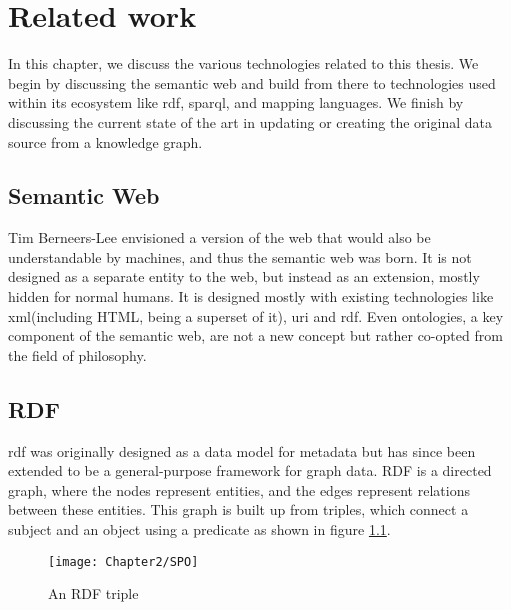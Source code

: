 
\chapter{Related work}
\label{chapter:related_work}

In this chapter, we discuss the various technologies related to this thesis. We begin by discussing the semantic web and build from there to technologies used within its ecosystem like \acrshort{rdf}, \acrshort{sparql}, and mapping languages. We finish by discussing the current state of the art in updating or creating the original data source from a knowledge graph.

\section{Semantic Web}
Tim Berneers-Lee envisioned a version of the web that would also be understandable by machines, and thus the semantic web was born. It is not designed as a separate entity to the web, but instead as an extension, mostly hidden for normal humans. It is designed mostly with existing technologies like \acrshort{xml}(including HTML, being a superset of it), \acrshort{uri} and \acrshort{rdf}. Even ontologies, a key component of the semantic web, are not a new concept but rather co-opted from the field of philosophy. \citep{thesemanticweb}

\section{RDF}
\acrshort{rdf} was originally designed as a data model for metadata but has since been extended to be a general-purpose framework for graph data. RDF is a directed graph, where the nodes represent entities, and the edges represent relations between these entities. This graph is built up from triples, which connect a subject and an object using a predicate as shown in figure \ref{fig:rdf_triple}.

\begin{figure}
    \centering
    \texttt{[image: Chapter2/SPO]}
    \caption{An RDF triple}
    \label{fig:rdf_triple}
\end{figure}

